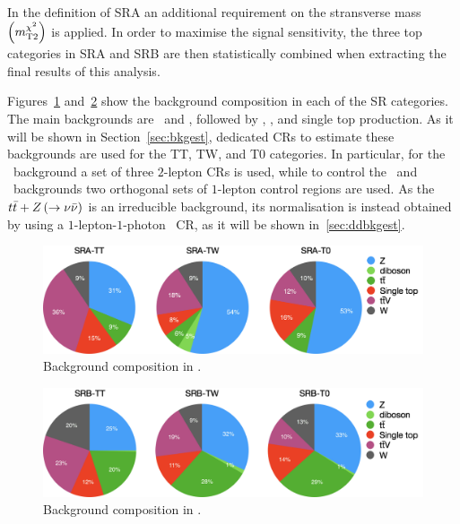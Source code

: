 				In the definition of SRA an additional requirement on the stransverse mass $\left(m_{\mathrm{T2}}^{\chi^2}\right)$ is applied. In order to maximise the signal sensitivity, the three top categories in SRA and SRB are then statistically combined when extracting the final results of this analysis. 

				Figures~\ref{fig:SRA_bkgcomp} and~\ref{fig:SRB_bkgcomp} show the background composition in each of the SR categories. The main backgrounds are \Zjets\ and \ttV, followed by \ttbar, \Wjets, and single top production. As it will be shown in Section~\ref{sec:bkgest}, dedicated \acp{CR} to estimate these backgrounds are used for the TT, TW, and T0 categories. In particular, for the \Zjets\ background a set of three $2$-lepton \acp{CR} is used, while to control the \ttbar\ and \Wjets\ backgrounds two orthogonal sets of $1$-lepton control regions are used. As the $t\bar{t}+Z \left ( \rightarrow \nu\bar{\nu}\right)$ is an irreducible background, its normalisation is instead obtained by using a $1$-lepton-$1$-photon \ttgamma\ \ac{CR}, as it will be shown in~\ref{sec:ddbkgest}.

				\begin{figure}[t]
				  \begin{center}
				   \includegraphics[width=\textwidth]{figures/stop/piechart_SRAcomp}
				   \caption{Background composition in \SRA.}
				   \label{fig:SRA_bkgcomp}
				  \end{center}
				\end{figure}


				\begin{figure}[t]
				  \begin{center}
				   \includegraphics[width=\textwidth]{figures/stop/piechart_SRBcomp}
				   \caption{Background composition in \SRB.}
				   \label{fig:SRB_bkgcomp}
				  \end{center}
				\end{figure}

